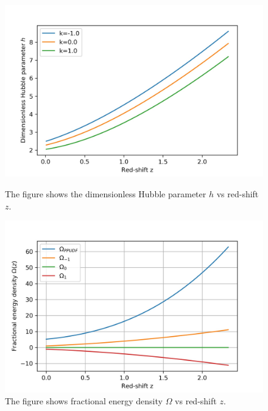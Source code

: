 \documentclass[8pt,hideothersubsections]{beamer}
\begin{document}
{\begin{frame}
\begin{figure}[ht]
    \begin{minipage}{0.49\linewidth}
        \centering
        \includegraphics[width=\textwidth]{./Images/UDF_H.jpg}
		\caption{The figure shows the dimensionless Hubble parameter $h$ vs red-shift $z$.}
		\label{fig:UDFH}
    \end{minipage}
    \begin{minipage}{0.49\linewidth}
        \centering
        \includegraphics[width=\textwidth]{./Images/UDF_Om.jpg}
		\caption{The figure shows fractional energy density $\Omega$ vs red-shift $z$.}
		\label{fig:UDFFracEnDen}
    \end{minipage}
\end{figure}


\end{frame}}
\end{document}
